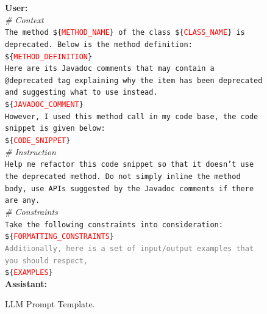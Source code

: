 \documentclass[sigconf]{acmart}
\newcommand{\templatevar}[1]{\$\{\textcolor{red}{#1}\}}
\begin{document}
\begin{figure}
  \centering
  \begin{tcolorbox}[
    colback=prompt_bg,
    colframe=prompt_title,
    subtitle style={boxrule=0.4pt, colback=yellow!50!blue!25!white, colupper=black}
  ]
  \scriptsize

  \textbf{User:}\\
  \textit{\# Context}\\
  \texttt{The method \templatevar{METHOD\_NAME} of the class \templatevar{CLASS\_NAME} is deprecated. Below is the method definition:}\\
  \texttt{\templatevar{METHOD\_DEFINITION}}\\

  \texttt{Here are its Javadoc comments that may contain a @deprecated tag explaining why the item has been deprecated and suggesting what to use instead.}\\
  \texttt{\templatevar{JAVADOC\_COMMENT}}\\

  \texttt{However, I used this method call in my code base, the code snippet is given below:}\\
  \texttt{\templatevar{CODE\_SNIPPET}}\\

  \textit{\# Instruction}\\
  \texttt{Help me refactor this code snippet so that it doesn't use the deprecated method. Do not simply inline the method body, use APIs suggested by the Javadoc comments if there are any.}\\

  \textit{\# Constraints}\\
  \texttt{Take the following constraints into consideration:}\\
  \texttt{\templatevar{FORMATTING\_CONSTRAINTS}}\\

  \texttt{\textcolor{gray}{Additionally, here is a set of input/output examples that you should respect,}}\\
  \texttt{\templatevar{EXAMPLES}}\\

  \textbf{Assistant:}\\
  \end{tcolorbox}
  \caption{LLM Prompt Template.}
  \label{fig:prompt}
\end{figure}
\end{document}
